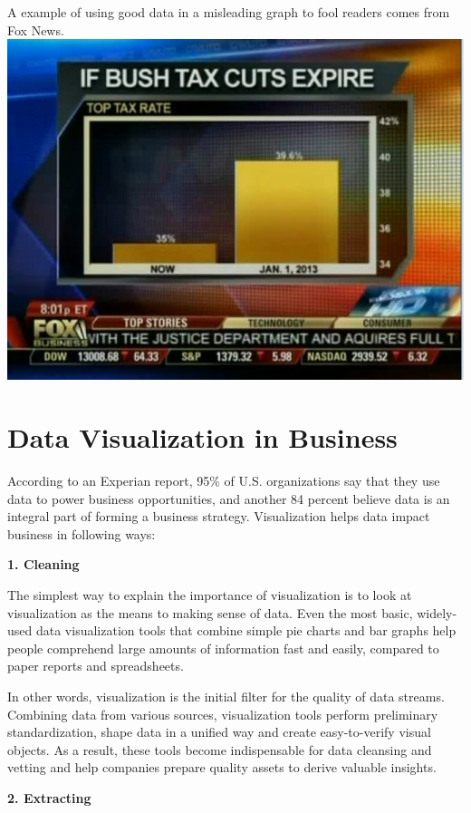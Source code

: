 \documentclass[]{book}
\theoremstyle{definition}
\theoremstyle{definition}
\theoremstyle{definition}
\theoremstyle{remark}
\begin{document}
A example of using good data in a misleading graph to fool readers comes
from Fox News. \includegraphics{images/1.png}

\section{Data Visualization in
Business}\label{data-visualization-in-business}

\citep{biz_strategy} According to an Experian report, 95\% of U.S.
organizations say that they use data to power business opportunities,
and another 84 percent believe data is an integral part of forming a
business strategy. Visualization helps data impact business in following
ways:

\textbf{1. Cleaning}

The simplest way to explain the importance of visualization is to look
at visualization as the means to making sense of data. Even the most
basic, widely-used data visualization tools that combine simple pie
charts and bar graphs help people comprehend large amounts of
information fast and easily, compared to paper reports and spreadsheets.

In other words, visualization is the initial filter for the quality of
data streams. Combining data from various sources, visualization tools
perform preliminary standardization, shape data in a unified way and
create easy-to-verify visual objects. As a result, these tools become
indispensable for data cleansing and vetting and help companies prepare
quality assets to derive valuable insights.

\textbf{2. Extracting}
\end{document}
